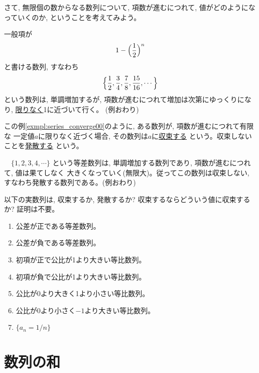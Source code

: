 さて, 無限個の数からなる数列について, 項数が進むにつれて, 値がどのようになっていくのか, 
ということを考えてみよう。

\begin{exmpl}\label{exmpl:series_converge00}
一般項が
\begin{eqnarray}1-\Bigl(\frac{1}{2}\Bigr)^n\end{eqnarray}
と書ける数列, すなわち
\begin{eqnarray}\Bigl\{\frac{1}{2}, \frac{3}{4}, \frac{7}{8}, \frac{15}{16}, \cdots\Bigr\}\end{eqnarray}
という数列は, 単調増加するが, 項数が進むにつれて増加は次第にゆっくりになり, \underline{限りなく}1に近づいて行く。
(例おわり)\end{exmpl}

この例\ref{exmpl:series_converge00}のように, ある数列が, 項数が進むにつれて有限な
一定値$a$に限りなく近づく場合, その数列は$a$に\underline{収束する}
という。収束しないことを\underline{発散する}
という。\hv

\begin{exmpl}\label{exmpl:series_infty00}　$\{1, 2, 3, 4, \cdots\}$
という等差数列は, 単調増加する数列であり, 項数が進むにつれて, 値は果てしなく
大きくなっていく(無限大)。従ってこの数列は収束しない, 
すなわち発散する数列である。(例おわり)\end{exmpl}

\begin{q}\label{q:alg_series3} 以下の実数列は, 収束するか, 発散するか?
 収束するならどういう値に収束するか? 証明は不要。
\begin{enumerate}
\item 公差が正である等差数列。
\item 公差が負である等差数列。
\item 初項が正で公比が1より大きい等比数列。
\item 初項が負で公比が1より大きい等比数列。
\item 公比が0より大きく1より小さい等比数列。
\item 公比が0より小さく$-1$より大きい等比数列。
\item $\{a_n=1/n\}$
\end{enumerate}
\end{q} 
\vv

\section{数列の和}

